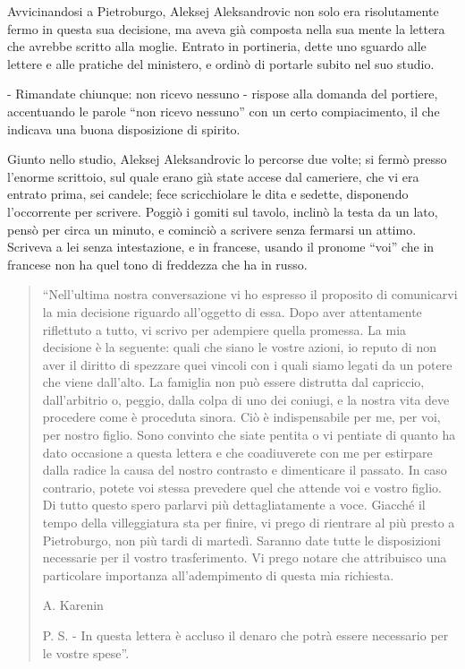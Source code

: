 Avvicinandosi a Pietroburgo, Aleksej Aleksandrovic non solo era risolutamente fermo in questa sua decisione, ma aveva già composta nella sua mente la lettera che avrebbe scritto alla moglie. Entrato in portineria, dette uno sguardo alle lettere e alle pratiche del ministero, e ordinò di portarle subito nel suo studio. 

- Rimandate chiunque: non ricevo nessuno - rispose alla domanda del portiere, accentuando le parole ``non ricevo nessuno'' con un certo compiacimento, il che indicava una buona disposizione di spirito. 

Giunto nello studio, Aleksej Aleksandrovic lo percorse due volte; si fermò presso l'enorme scrittoio, sul quale erano già state accese dal cameriere, che vi era entrato prima, sei candele; fece scricchiolare le dita e sedette, disponendo l'occorrente per scrivere. Poggiò i gomiti sul tavolo, inclinò la testa da un lato, pensò per circa un minuto, e cominciò a scrivere senza fermarsi un attimo. Scriveva a lei senza intestazione, e in francese, usando il pronome ``voi'' che in francese non ha quel tono di freddezza che ha in russo. 

\begin{quote}
``Nell'ultima nostra conversazione vi ho espresso il proposito di comunicarvi la mia decisione riguardo all'oggetto di essa. Dopo aver attentamente riflettuto a tutto, vi scrivo per adempiere quella promessa. La mia decisione è la seguente: quali che siano le vostre azioni, io reputo di non aver il diritto di spezzare quei vincoli con i quali siamo legati da un potere che viene dall'alto. La famiglia non può essere distrutta dal capriccio, dall'arbitrio o, peggio, dalla colpa di uno dei coniugi, e la nostra vita deve procedere come è proceduta sinora. Ciò è indispensabile per me, per voi, per nostro figlio. Sono convinto che siate pentita o vi pentiate di quanto ha dato occasione a questa lettera e che coadiuverete con me per estirpare dalla radice la causa del nostro contrasto e dimenticare il passato. In caso contrario, potete voi stessa prevedere quel che attende voi e vostro figlio. Di tutto questo spero parlarvi più dettagliatamente a voce. Giacché il tempo della villeggiatura sta per finire, vi prego di rientrare al più presto a Pietroburgo, non più tardi di martedì. Saranno date tutte le disposizioni necessarie per il vostro trasferimento. Vi prego notare che attribuisco una particolare importanza all'adempimento di questa mia richiesta.

A. Karenin

P. S. - In questa lettera è accluso il denaro che potrà essere necessario per le vostre spese''.
\end{quote} 

